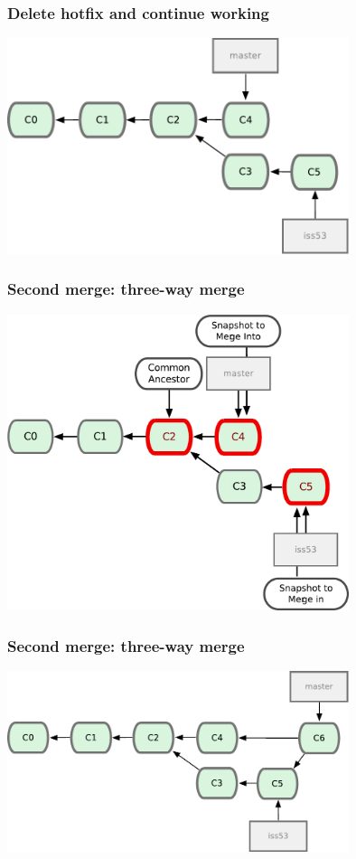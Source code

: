 \documentclass{gittalk}
\begin{document}
\begin{frame}
  \frametitle{Delete hotfix and continue working}
\begin{center}
  \includegraphics[width=0.75\textwidth]{./img/fig0315.pdf}
\end{center}
\end{frame}

\begin{frame}
  \frametitle{Second merge: three-way merge}
\begin{center}
  \includegraphics[width=0.75\textwidth]{./img/fig0316.pdf}
\end{center}
\end{frame}

\begin{frame}
  \frametitle{Second merge: three-way merge}
\begin{center}
  \includegraphics[width=0.75\textwidth]{./img/fig0317.pdf}
\end{center}
\end{frame}
\end{document}
